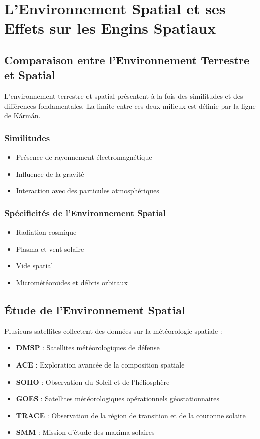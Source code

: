 \section{L'Environnement Spatial et ses Effets sur les Engins Spatiaux}

\subsection{Comparaison entre l’Environnement Terrestre et Spatial}
L’environnement terrestre et spatial présentent à la fois des similitudes et des différences fondamentales. La limite entre ces deux milieux est définie par la ligne de Kármán.

\subsubsection{Similitudes}
\begin{itemize}
    \item Présence de rayonnement électromagnétique
    \item Influence de la gravité
    \item Interaction avec des particules atmosphériques
\end{itemize}

\subsubsection{Spécificités de l’Environnement Spatial}
\begin{itemize}
    \item Radiation cosmique
    \item Plasma et vent solaire
    \item Vide spatial
    \item Micrométéoroïdes et débris orbitaux
\end{itemize}

\subsection{Étude de l’Environnement Spatial}
Plusieurs satellites collectent des données sur la météorologie spatiale :
\begin{itemize}
    \item \textbf{DMSP} : Satellites météorologiques de défense
    \item \textbf{ACE} : Exploration avancée de la composition spatiale
    \item \textbf{SOHO} : Observation du Soleil et de l’héliosphère
    \item \textbf{GOES} : Satellites météorologiques opérationnels géostationnaires
    \item \textbf{TRACE} : Observation de la région de transition et de la couronne solaire
    \item \textbf{SMM} : Mission d’étude des maxima solaires
\end{itemize}

